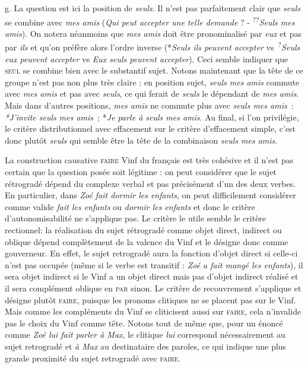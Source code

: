 {    g. La question est ici la position de \textit{seuls}. Il n’est pas parfaitement clair que \textit{seuls} se combine avec \textit{mes amis} (\textit{Qui peut accepter une telle demande} ? - \textsuperscript{??}\textit{Seuls mes amis}). On notera néanmoins que \textit{mes amis} doit être pronominalisé par \textit{eux} et pas par \textit{ils} et qu’on préfère alors l’ordre inverse (*\textit{Seuls ils peuvent accepter} vs~\textsuperscript{?}\textit{Seuls eux peuvent accepter} vs \textit{Eux seuls peuvent accepter}). Ceci semble indiquer que \textsc{seul} se combine bien avec le substantif sujet. Notons maintenant que la tête de ce groupe n’est pas non plus très claire : en position sujet, \textit{seuls mes amis} commute avec \textit{mes amis} et pas avec \textit{seuls}, ce qui ferait de \textit{seuls} le dépendant de \textit{mes amis}. Mais dans d’autres positions, \textit{mes amis} ne commute plus avec \textit{seuls mes amis~}: \textit{*J’invite seuls mes amis~}; *\textit{Je parle à seuls mes amis}. Au final, si l’on privilégie, le critère distributionnel avec effacement sur le critère d’effacement simple, c’est donc plutôt \textit{seuls} qui semble être la tête de la combinaison \textit{seuls mes amis}.

     La construction causative \textsc{faire} Vinf du français est très cohésive et il n’est pas certain que la question posée soit légitime : on peut considérer que le sujet rétrogradé dépend du complexe verbal et pas précisément d’un des deux verbes. En particulier, dans \textit{Zoé fait dormir les enfants}, on peut difficilement considérer comme valide \textit{fait les enfants} ou \textit{dormir les enfants} et donc le critère d’autonomisabilité ne s’applique pas. Le critère le utile semble le critère rectionnel: la réalisation du sujet rétrogradé comme objet direct, indirect ou oblique dépend complètement de la valence du Vinf et le désigne donc comme gouverneur. En effet, le sujet retrogradé aura la fonction d’objet direct si celle-ci n’est pas occupée (même si le verbe est transitif : \textit{Zoé a fait mangé les enfants}), il sera objet indirect si le Vinf a un objet direct mais pas d’objet indirect réalisé et il sera complément oblique en \textsc{par} sinon. Le critère de recouvrement s’applique et désigne plutôt \textsc{faire}, puisque les pronoms clitiques ne se placent pas sur le Vinf. Mais comme les compléments du Vinf se cliticisent aussi sur \textsc{faire}, cela n’invalide pas le choix du Vinf comme tête. Notons tout de même que, pour un énoncé comme \textit{Zoé lui fait parler à Max}, le clitique \textit{lui} correspond nécessairement au sujet retrogradé et \textit{à Max} au destinataire des paroles, ce qui indique une plus grande proximité du sujet retrogradé avec \textsc{faire}.

}
